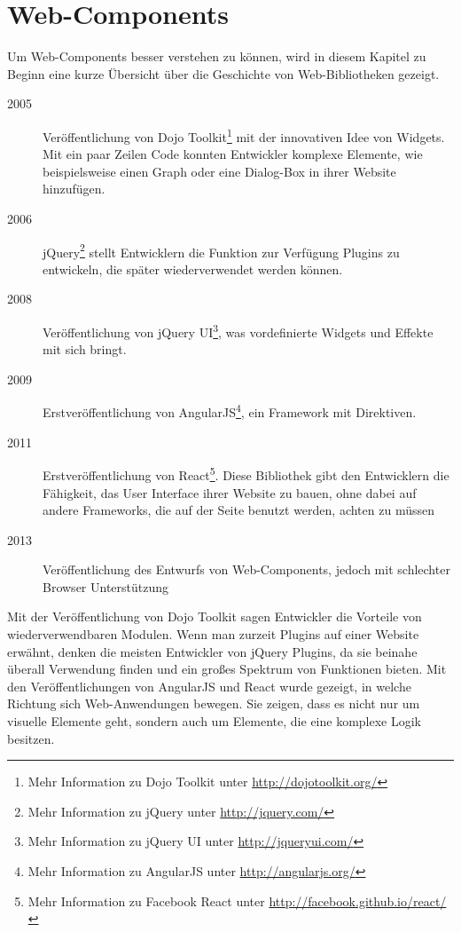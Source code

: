 \section{Web-Components}
\label{sec:3_Web_Components}


Um Web-Components besser verstehen zu können, wird in diesem Kapitel zu Beginn eine kurze Übersicht über die Geschichte von Web-Bibliotheken gezeigt.

\begin{description}
\item[2005] Veröffentlichung von Dojo Toolkit\footnote{Mehr Information zu Dojo Toolkit unter \href{http://dojotoolkit.org/}{http://dojotoolkit.org/}} mit der innovativen Idee von Widgets. Mit ein paar Zeilen Code konnten Entwickler komplexe Elemente, wie beispielsweise einen Graph oder eine Dialog-Box in ihrer Website hinzufügen.
\item[2006] jQuery\footnote{Mehr Information zu jQuery unter \href{http://jquery.com/}{http://jquery.com/}} stellt Entwicklern die Funktion zur Verfügung Plugins zu entwickeln, die später wiederverwendet werden können.
\item[2008] Veröffentlichung von jQuery UI\footnote{Mehr Information zu jQuery UI unter \href{http://jqueryui.com/}{http://jqueryui.com/}}, was vordefinierte Widgets und Effekte mit sich bringt.
\item[2009] Erstveröffentlichung von AngularJS\footnote{Mehr Information zu AngularJS unter \href{http://angularjs.org/}{http://angularjs.org/}}, ein Framework mit Direktiven.
\item[2011] Erstveröffentlichung von React\footnote{Mehr Information zu Facebook React unter \href{http://facebook.github.io/react/}{http://facebook.github.io/react/}}. Diese Bibliothek gibt den Entwicklern die Fähigkeit, das User Interface ihrer Website zu bauen, ohne dabei auf andere Frameworks, die auf der Seite benutzt werden, achten zu müssen
\item[2013] Veröffentlichung des Entwurfs von Web-Components, jedoch mit schlechter Browser Unterstützung
\end{description}

Mit der Veröffentlichung von Dojo Toolkit sagen Entwickler die Vorteile von wiederverwendbaren Modulen. Wenn man zurzeit Plugins auf einer Website erwähnt, denken die meisten Entwickler von jQuery Plugins, da sie beinahe überall Verwendung finden und ein großes Spektrum von Funktionen bieten. Mit den Veröffentlichungen von AngularJS und React wurde gezeigt, in welche Richtung sich Web-Anwendungen bewegen. Sie zeigen, dass es nicht nur um visuelle Elemente geht, sondern auch um Elemente, die eine komplexe Logik besitzen.




